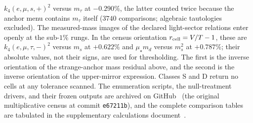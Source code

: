 \documentclass[aps,twocolumn,superscriptaddress,nofootinbib,floatfix]{revtex4-2}
\newcommand{\mstar}{\mu_\star}
\begin{document}
$k_4(e,\mu,s,+)^2$ versus $m_\tau$ at $-0.290\%$, the latter counted twice because the anchor menu contains $m_\tau$ itself ($3740$ comparisons; algebraic tautologies excluded). The measured-mass images of the declared light-sector relations enter openly at the sub-$1\%$ rungs. In the census orientation $r_{\rm cell}=V/T-1$, these are $k_4(e,\mu,\tau,-)^2$ versus $m_s$ at $+0.622\%$ and $\mstar m_d$ versus $m_s^2$ at $+0.787\%$; their absolute values, not their signs, are used for thresholding. The first is the inverse orientation of the strange-anchor mass residual above, and the second is the inverse orientation of the upper-mirror expression. Classes S and D return no cells at any tolerance scanned. The enumeration scripts, the null-treatment drivers, and their frozen outputs are archived on GitHub~\cite{BrilliantGitHubEnum} (the original multiplicative census at commit \texttt{e67211b}), and the complete comparison tables are tabulated in the supplementary calculations document~\cite{BrilliantZenodoSupp}.
\end{document}
